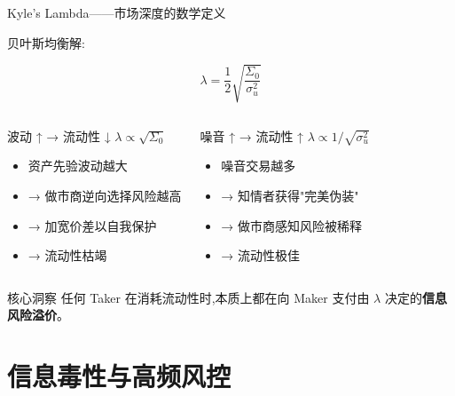 \documentclass[10pt,aspectratio=169]{beamer}
\begin{document}
\begin{frame}{Kyle's Lambda——市场深度的数学定义}

  贝叶斯均衡解:

  \[
    \boxed{ \lambda = \frac{1}{2} \sqrt{\frac{\Sigma_0}{\sigma_u^2}} }
  \]

  \vfill

  \begin{columns}[t]
    \begin{block}{波动 ↑ → 流动性 ↓}
      $\lambda \propto \sqrt{\Sigma_0}$
      \begin{itemize}
        \item 资产先验波动越大
        \item → 做市商逆向选择风险越高
        \item → 加宽价差以自我保护
        \item → 流动性枯竭
      \end{itemize}
    \end{block}

    \begin{block}{噪音 ↑ → 流动性 ↑}
      $\lambda \propto 1/\sqrt{\sigma_u^2}$
      \begin{itemize}
        \item 噪音交易越多
        \item → 知情者获得"完美伪装"
        \item → 做市商感知风险被稀释
        \item → 流动性极佳
      \end{itemize}
    \end{block}
  \end{columns}

  \vfill

  \begin{alertblock}{核心洞察}
    任何 Taker 在消耗流动性时,本质上都在向 Maker 支付由 $\lambda$ 决定的\textbf{信息风险溢价}。
  \end{alertblock}

\end{frame}

\section{信息毒性与高频风控}
\end{document}
